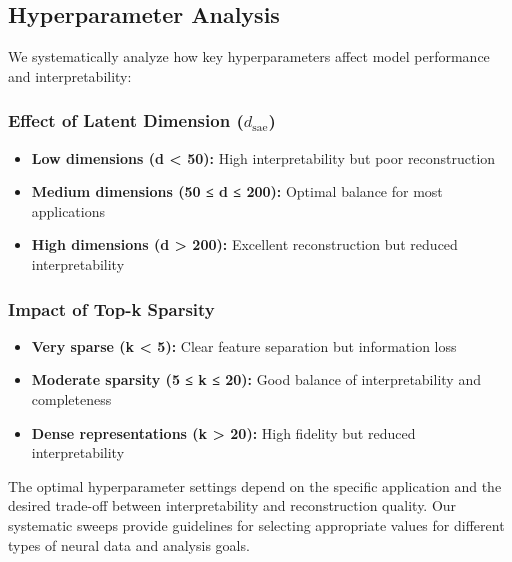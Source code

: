 \subsection{Hyperparameter Analysis}

We systematically analyze how key hyperparameters affect model performance and interpretability:

\subsubsection{Effect of Latent Dimension ($d_{\text{sae}}$)}

\begin{itemize}
\item \textbf{Low dimensions (d < 50):} High interpretability but poor reconstruction
\item \textbf{Medium dimensions (50 ≤ d ≤ 200):} Optimal balance for most applications
\item \textbf{High dimensions (d > 200):} Excellent reconstruction but reduced interpretability
\end{itemize}

\subsubsection{Impact of Top-k Sparsity}

\begin{itemize}
\item \textbf{Very sparse (k < 5):} Clear feature separation but information loss
\item \textbf{Moderate sparsity (5 ≤ k ≤ 20):} Good balance of interpretability and completeness
\item \textbf{Dense representations (k > 20):} High fidelity but reduced interpretability
\end{itemize}

The optimal hyperparameter settings depend on the specific application and the desired trade-off between interpretability and reconstruction quality. Our systematic sweeps provide guidelines for selecting appropriate values for different types of neural data and analysis goals.
